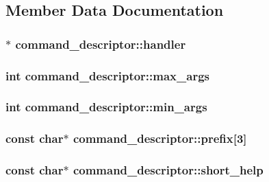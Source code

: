 \subsection{Member Data Documentation}
\hypertarget{structcommand__descriptor_abc53ab6c6c7267ba08b58d8fb05105d3}{
\subsubsection[{handler}]{$\ast$ command\+\_\+descriptor\+::handler}}\label{structcommand__descriptor_abc53ab6c6c7267ba08b58d8fb05105d3}
\hypertarget{structcommand__descriptor_acf2f0d6f9aa089fd8b5747e492e944b2}{
\subsubsection[{max\+\_\+args}]{\setlength{\rightskip}{0pt plus 5cm}int command\+\_\+descriptor\+::max\+\_\+args}}\label{structcommand__descriptor_acf2f0d6f9aa089fd8b5747e492e944b2}
\hypertarget{structcommand__descriptor_aae0e62e31c93bfc3d6c1963a2b6752c9}{
\subsubsection[{min\+\_\+args}]{\setlength{\rightskip}{0pt plus 5cm}int command\+\_\+descriptor\+::min\+\_\+args}}\label{structcommand__descriptor_aae0e62e31c93bfc3d6c1963a2b6752c9}
\hypertarget{structcommand__descriptor_a8700eeae6abedd60b5bf2199a84d7cf0}{
\subsubsection[{prefix}]{\setlength{\rightskip}{0pt plus 5cm}const char$\ast$ command\+\_\+descriptor\+::prefix\mbox{[}3\mbox{]}}}\label{structcommand__descriptor_a8700eeae6abedd60b5bf2199a84d7cf0}
\hypertarget{structcommand__descriptor_afea1160b3567f96a39a1a2c567312f94}{
\subsubsection[{short\+\_\+help}]{\setlength{\rightskip}{0pt plus 5cm}const char$\ast$ command\+\_\+descriptor\+::short\+\_\+help}}\label{structcommand__descriptor_afea1160b3567f96a39a1a2c567312f94}
